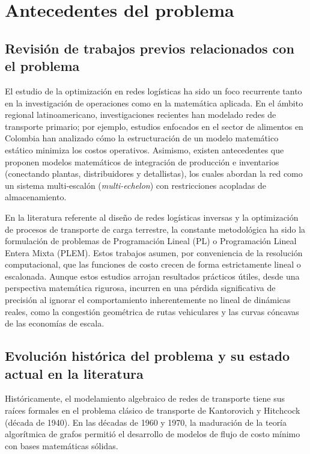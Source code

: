 \section{Antecedentes del problema}

\subsection{Revisión de trabajos previos relacionados con el problema}
El estudio de la optimización en redes logísticas ha sido un foco recurrente tanto en la investigación de operaciones como en la matemática aplicada. En el ámbito regional latinoamericano, investigaciones recientes han modelado redes de transporte primario; por ejemplo, estudios enfocados en el sector de alimentos en Colombia han analizado cómo la estructuración de un modelo matemático estático minimiza los costos operativos. Asimismo, existen antecedentes que proponen modelos matemáticos de integración de producción e inventarios (conectando plantas, distribuidores y detallistas), los cuales abordan la red como un sistema multi-escalón (\textit{multi-echelon}) con restricciones acopladas de almacenamiento.

En la literatura referente al diseño de redes logísticas inversas y la optimización de procesos de transporte de carga terrestre, la constante metodológica ha sido la formulación de problemas de Programación Lineal (PL) o Programación Lineal Entera Mixta (PLEM). Estos trabajos asumen, por conveniencia de la resolución computacional, que las funciones de costo crecen de forma estrictamente lineal o escalonada. Aunque estos estudios arrojan resultados prácticos útiles, desde una perspectiva matemática rigurosa, incurren en una pérdida significativa de precisión al ignorar el comportamiento inherentemente no lineal de dinámicas reales, como la congestión geométrica de rutas vehiculares y las curvas cóncavas de las economías de escala.

\subsection{Evolución histórica del problema y su estado actual en la literatura}
Históricamente, el modelamiento algebraico de redes de transporte tiene sus raíces formales en el problema clásico de transporte de Kantorovich y Hitchcock (década de 1940). En las décadas de 1960 y 1970, la maduración de la teoría algorítmica de grafos permitió el desarrollo de modelos de flujo de costo mínimo con bases matemáticas sólidas. 


